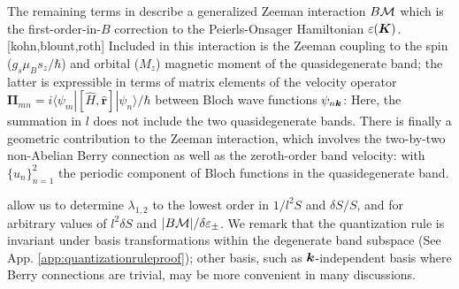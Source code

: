 \documentclass[aps, prb, showpacs, twocolumn, notitlepage, superscriptaddress]{revtex4-1}
\begin{document}
The remaining terms in  describe a generalized Zeeman interaction $B{\cal M}$ which is the first-order-in-$B$ correction to the Peierls-Onsager Hamiltonian $\varepsilon(\boldsymbol{K})$.[kohn,blount,roth] Included in this interaction is the Zeeman coupling to the spin ($g_s\mu_Bs_z/\hbar$) and orbital ($M_z$) magnetic moment of the quasidegenerate band; the latter is expressible in terms of matrix elements of the velocity operator $\boldsymbol{\Pi}_{mn}=i\langle\psi_m|[\hat{H}, \hat{\boldsymbol{r}}]|\psi_n\rangle/\hbar$ between Bloch wave functions $\psi_{n\boldsymbol{k}}$:
Here, the summation in $l$ does not include the two quasidegenerate bands.  There is finally a geometric contribution to the Zeeman interaction, which involves the two-by-two non-Abelian Berry connection  as well as the  zeroth-order band velocity: 
with $\{u_n\}_{n=1}^2$ the periodic component of Bloch functions in the quasidegenerate band. 

 allow us to determine $\lambda_{1,2}$ to the lowest order  in $1/l^2S$ and $\delta S/S$, and for arbitrary values of $l^2\delta S$ and $|B{\cal M}|/\delta \varepsilon_{\pm}$. We remark that the quantization rule is invariant under basis transformations within the degenerate band subspace (See App. \ref{app:quantizationruleproof}); other basis, such as $\boldsymbol{k}$-independent basis where Berry connections are trivial, may be more convenient in many discussions.

\end{document}
